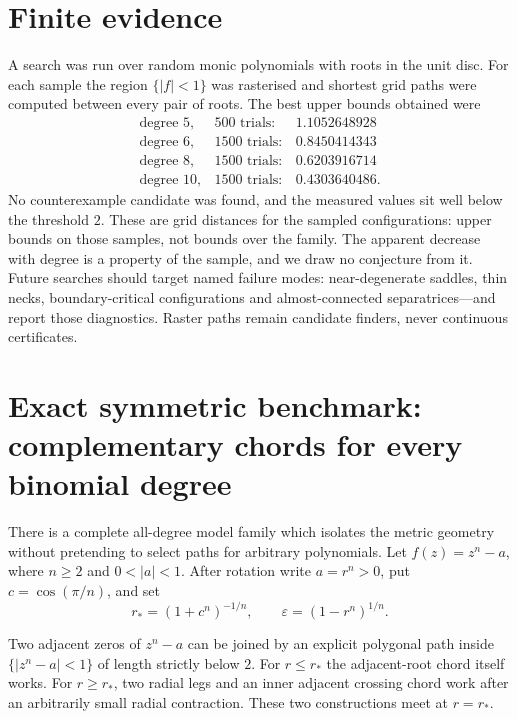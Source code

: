 \documentclass[11pt]{article}
\begin{document}
\section{Finite evidence}\label{sec:finite}

A search was run over random monic polynomials with roots in the unit disc.  For
each sample the region $\{|f|<1\}$ was rasterised and shortest grid paths were
computed between every pair of roots.  The best upper bounds obtained were
\[
  \begin{array}{lrr}
    \text{degree } 5, & 500 \text{ trials}: & 1.1052648928\\
    \text{degree } 6, & 1500 \text{ trials}: & 0.8450414343\\
    \text{degree } 8, & 1500 \text{ trials}: & 0.6203916714\\
    \text{degree } 10, & 1500 \text{ trials}: & 0.4303640486 .
  \end{array}
\]
No counterexample candidate was found, and the measured values sit well below
the threshold $2$.  These are grid distances for the sampled configurations:
upper bounds on those samples, not bounds over the family.  The apparent
decrease with degree is a property of the sample, and we draw no conjecture from
it.
Future searches should target named failure modes: near-degenerate saddles,
thin necks, boundary-critical configurations and almost-connected
separatrices---and report those diagnostics.  Raster paths remain candidate
finders, never continuous certificates.

\section{Exact symmetric benchmark: complementary chords for every binomial degree}
\label{sec:binomial}


There is a complete all-degree model family which isolates the metric geometry
without pretending to select paths for arbitrary polynomials.  Let
$f(z)=z^n-a$, where $n\ge2$ and $0<|a|<1$.  After rotation write $a=r^n>0$,
put $c=\cos(\pi/n)$, and set
\[
 r_*=(1+c^n)^{-1/n},\qquad
 \varepsilon=(1-r^n)^{1/n}.
\]

\begin{theorem}
Two adjacent zeros of $z^n-a$ can be joined by an explicit polygonal path
inside $\{|z^n-a|<1\}$ of length strictly below $2$.  For $r\le r_*$ the
adjacent-root chord itself works.  For $r\ge r_*$, two radial legs and an
inner adjacent crossing chord work after an arbitrarily small radial
contraction.  These two constructions meet at $r=r_*$.
\end{theorem}
\end{document}
